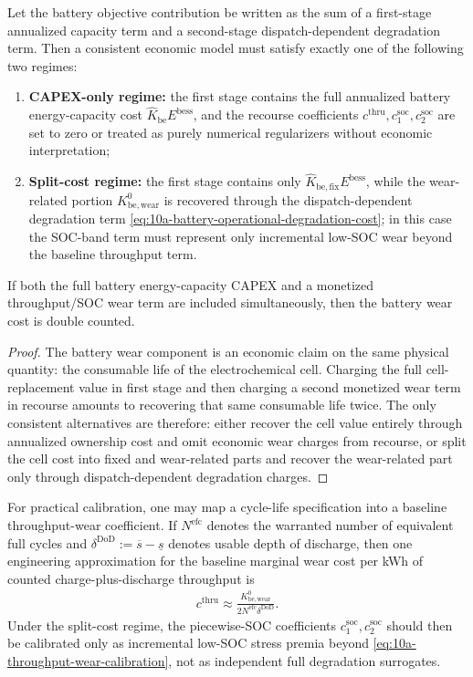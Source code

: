 \begin{proposition}
Let the battery objective contribution be written as the sum of a first-stage annualized capacity term and a second-stage dispatch-dependent degradation term. Then a consistent economic model must satisfy exactly one of the following two regimes:
\begin{enumerate}
  \item \textbf{CAPEX-only regime:} the first stage contains the full annualized battery energy-capacity cost \(\widehat K_{\mathrm{be}} E^{\mathrm{bess}}\), and the recourse coefficients \(c^{\mathrm{thru}},c^{\mathrm{soc}}_1,c^{\mathrm{soc}}_2\) are set to zero or treated as purely numerical regularizers without economic interpretation;
  \item \textbf{Split-cost regime:} the first stage contains only \(\widehat K_{\mathrm{be,fix}} E^{\mathrm{bess}}\), while the wear-related portion \(K_{\mathrm{be,wear}}^0\) is recovered through the dispatch-dependent degradation term \eqref{eq:10a-battery-operational-degradation-cost}; in this case the SOC-band term must represent only incremental low-SOC wear beyond the baseline throughput term.
\end{enumerate}
If both the full battery energy-capacity CAPEX and a monetized throughput/SOC wear term are included simultaneously, then the battery wear cost is double counted.
\end{proposition}

\begin{proof}
The battery wear component is an economic claim on the same physical quantity: the consumable life of the electrochemical cell. Charging the full cell-replacement value in first stage and then charging a second monetized wear term in recourse amounts to recovering that same consumable life twice. The only consistent alternatives are therefore: either recover the cell value entirely through annualized ownership cost and omit economic wear charges from recourse, or split the cell cost into fixed and wear-related parts and recover the wear-related part only through dispatch-dependent degradation charges.
\end{proof}

For practical calibration, one may map a cycle-life specification into a baseline throughput-wear coefficient. If \(N^{\mathrm{efc}}\) denotes the warranted number of equivalent full cycles and \(\delta^{\mathrm{DoD}}:=\overline s-\underline s\) denotes usable depth of discharge, then one engineering approximation for the baseline marginal wear cost per kWh of counted charge-plus-discharge throughput is
\begin{align}
c^{\mathrm{thru}} \approx \frac{K_{\mathrm{be,wear}}^0}{2 N^{\mathrm{efc}} \delta^{\mathrm{DoD}}}.
\label{eq:10a-throughput-wear-calibration}
\end{align}
Under the split-cost regime, the piecewise-SOC coefficients \(c^{\mathrm{soc}}_1,c^{\mathrm{soc}}_2\) should then be calibrated only as incremental low-SOC stress premia beyond \eqref{eq:10a-throughput-wear-calibration}, not as independent full degradation surrogates.

